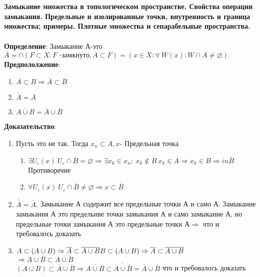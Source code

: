 \section{}
	\textbf{Замыкание множества в топологическом пространстве. Свойства операции замыкания. Предельные и изолированные точки, внутренность и граница множества; примеры. Плотные множества и сепарабельные пространства.}\\
	\\
	\textbf{Определение}: Замыкание А-это $\overline{A} = \cap (F\subset X: F \text{ -замкнуто}, A\subset F) = (x\in X: \forall\ W(x): W\cap A \neq \varnothing)$\\
	\textbf{Предпололжение}: 
	\begin{enumerate}
		\item $A \subset B \Rightarrow \overline{A} \subset \overline{B}$
		\item $\overline{\overline{A}} = \overline{A}$
		\item $\overline{A \cup B} = \overline{A} \cup \overline{B}$
	\end{enumerate}
	\textbf{Доказательство}: 
	\begin{enumerate}
		\item 
		Пусть это не так. Тогда $x_n \subset A, x \text{- Предельная точка}$\\
		\begin{enumerate}
			\item $\exists U_{\varepsilon}(x)\ U_{\varepsilon} \cap \overline{B} = \varnothing \Rightarrow \exists x_k \in x_n:\ x_k \notin \overline{B}\ x_k \in A \Rightarrow x_k \in B \Rightarrow in \overline{B}$ Противоречие
			\item 
			$\forall U_{\varepsilon}(x)\ U_{\varepsilon} \cap \overline{B} \neq \varnothing \Rightarrow x \subset \overline{B}$
		\end{enumerate}
		\item 
		$\overline{\overline{A}} = \overline{A}.$ Замыкание А содержит все предельные точки А и само А. Замыкание замыкания А это предельнве точки замыкания А и само замыкание А, но предельные точки замыкания А это предельные точки А$\Rightarrow$ что и требовалось доказать\\
		\item 
		$A \subset (A \cup B) \Rightarrow \overline{A} \subset \overline{A\cup B}\\
		B \subset (A \cup B) \Rightarrow \overline{A} \subset \overline{A\cup B}$\\
		$\Rightarrow \overline{A} \cup \overline{B} \subset \overline{A\cup B}$\\
		$(A\cup B) \subset \overline{A} \cup \overline{B} \Rightarrow \overline{A \cup B} \subset \overline{\overline{A} \cup \overline{B}} = \overline{A} \cup \overline{B}$ что и требовалось доказать\\
	\end{enumerate}
